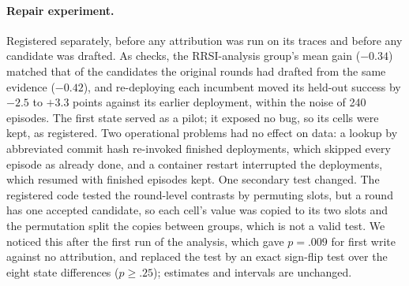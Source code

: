 \documentclass[11pt]{article}
\begin{document}
\paragraph{Repair experiment.} Registered separately, before any attribution was run on its traces and before any candidate was drafted. As checks, the RRSI-analysis group's mean gain ($-0.34$) matched that of the candidates the original rounds had drafted from the same evidence ($-0.42$), and re-deploying each incumbent moved its held-out success by $-2.5$ to $+3.3$ points against its earlier deployment, within the noise of 240 episodes. The first state served as a pilot; it exposed no bug, so its cells were kept, as registered. Two operational problems had no effect on data: a lookup by abbreviated commit hash re-invoked finished deployments, which skipped every episode as already done, and a container restart interrupted the deployments, which resumed with finished episodes kept. One secondary test changed. The registered code tested the round-level contrasts by permuting slots, but a round has one accepted candidate, so each cell's value was copied to its two slots and the permutation split the copies between groups, which is not a valid test. We noticed this after the first run of the analysis, which gave $p=.009$ for first write against no attribution, and replaced the test by an exact sign-flip test over the eight state differences ($p\ge.25$); estimates and intervals are unchanged.
\end{document}
